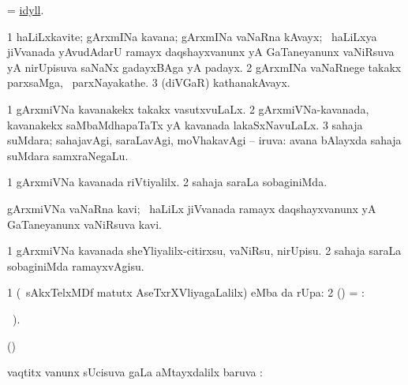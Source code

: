 \bentry
{}
\gl{\nA}
\bmng
 = \hyperlink{idyll}{idyll}. 
\emng
\eentry

\bentry
{}
\gl{\nA}
\bmng
\bnum
\num{1} haLiLxkavite; gArxmINa kavana; gArxmINa vaNaRna kAvayx; \kanmu\ haLiLxya jiVvanada yAvudAdarU ramayx daqshayxvanunx yA GaTaneyanunx vaNiRsuva yA nirUpisuva saNaNx gadayxBAga yA padayx. 
\num{2} gArxmINa vaNaRnege takakx parxsaMga, \sA\ parxNayakathe. 
\num{3} (diVGaR) kathanakAvayx. 
\enum
\emng
\eentry

\bentry
{}
\gl{\gu}
\bmng
\bnum
\num{1} gArxmiVNa kavanakekx takakx vasutxvuLaLx. 
\num{2} gArxmiVNa-kavanada, kavanakekx saMbaMdhapaTaTx yA kavanada lakaSxNavuLaLx. 
\num{3} sahaja suMdara; sahajavAgi, saraLavAgi, moVhakavAgi -- iruva:  avana bAlayxda sahaja suMdara samxraNegaLu. 
\enum
\emng
\eentry

\bentry
{}
\gl{\kirxvi}
\bmng
\bnum
\num{1} gArxmiVNa kavanada riVtiyalilx. 
\num{2} sahaja saraLa sobaginiMda. 
\enum
\emng
\eentry

\bentry
{}
\gl{\nA}
\bmng
gArxmiVNa vaNaRna kavi; \kanmu\ haLiLx jiVvanada ramayx daqshayxvanunx yA GaTaneyanunx vaNiRsuva kavi. 
\emng
\eentry

\bentry
{}
\gl{\sakirx}
\bmng
\bnum
\num{1} gArxmiVNa kavanada sheYliyalilx-citirxsu, vaNiRsu, nirUpisu. 
\num{2} sahaja saraLa sobaginiMda ramayxvAgisu. 
\enum
\emng
\eentry

\bentry
{}
\gl{\uparx}
\bmng
\bnum
\num{1} (\sA\ sAkxTelxMDf matutx AseTxrXVliyagaLalilx)  eMba \uparx da rUpa:  
\num{2} (\pArxparx) = :  
\enum
\emng
\eentry

\bentry
{}
\gl{\saMkiSx}
\bmng
{}\Latin\ ). 
\emng
\eentry

\bentry
{}
\gl{\saMkiSx}
\bmng
(\birx)  
\emng
\eentry

\bentry
{}
\gl{\uparx}
\bmng
vaqtitx \mo vanunx sUcisuva \nA gaLa aMtayxdalilx baruva \uparx:  
\emng
\eentry

